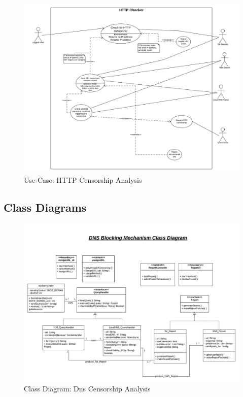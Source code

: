 \documentclass[12pt]{article}
\begin{document}
\begin{figure}[H]
    \centering
    \includegraphics[width=\textwidth]{Diagrams/uchttp.png}
    \caption{Use-Case: HTTP Censorship Analysis}
    \label{fig:ucdns}
\end{figure}



\subsection{Class Diagrams}

\begin{figure}[H]
    \centering
    \includegraphics[width=\textwidth]{Diagrams/cddns.png}
    \caption{Class Diagram: Dns Censorship Analysis}
    \label{fig:ucdns}
\end{figure}
\end{document}
